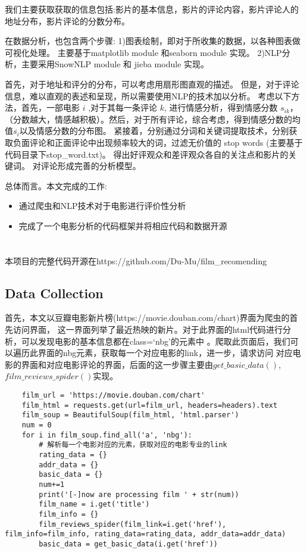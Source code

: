 \documentclass[12pt]{article}
\begin{document}
我们主要获取获取的信息包括:影片的基本信息，影片的评论内容，影片评论人的地址分布，影片评论的分数分布。
\\
\par
在数据分析，也包含两个步骤: 1)图表绘制，即对于所收集的数据，以各种图表做可视化处理。
主要基于matplotlib module 和seaborn module 实现。 2)NLP分析，主要采用SnowNLP module 和
jieba module 实现。\cite{wangWhichMoreSuitable2009}
\par
首先，对于地址和评分的分布，可以考虑用扇形图直观的描述。
但是，对于评论信息，难以直观的表述和呈现，所以需要使用NLP的技术加以分析。
考虑以下方法，首先，一部电影 $i$ ,对于其每一条评论 $k$, 进行情感分析，得到情感分数 $s_{ik}$，
（分数越大，情感越积极）。然后，对于所有评论，综合考虑，得到情感分数的均值$\overline{s_i}$以及情感分数的分布图。
紧接着，分别通过分词和关键词提取技术，分别获取负面评论和正面评论中出现频率较大的词，过滤无价值的 stop words
(主要基于代码目录下stop\_word.txt)。
得出好评观众和差评观众各自的关注点和影片的关键词。 对评论形成完善的分析模型。
\\
\par 
总体而言。本文完成的工作:
\begin{itemize}
    \item 通过爬虫和NLP技术对于电影进行评价性分析
    \item 完成了一个电影分析的代码框架并将相应代码和数据开源
\end{itemize}

\section{}
本项目的完整代码开源在https://github.com/Du-Mu/film\_recomending

\subsection{Data Collection}

首先，本文以豆瓣电影新片榜(https://movie.douban.com/chart)界面为爬虫的首先访问界面，
这一界面列举了最近热映的新片。对于此界面的html代码进行分析，可以发现电影的基本信息都在class=‘nbg’的元素中
。爬取此页面后，我们可以遍历此界面的nbg元素，获取每一个对应电影的link，进一步，请求访问
对应电影的界面和对应电影评论的界面，后面的这一步骤主要由$get\_basic\_data()$,$film\_reviews\_spider()$实现。
\lstset{language=Python}
\begin{lstlisting}
    film_url = 'https://movie.douban.com/chart'
    film_html = requests.get(url=film_url, headers=headers).text
    film_soup = BeautifulSoup(film_html, 'html.parser')
    num = 0
    for i in film_soup.find_all('a', 'nbg'):
        # 解析每一个电影对应的元素，获取对应的电影专业的link
        rating_data = {}
        addr_data = {}
        basic_data = {}
        num+=1
        print('[-]now are processing film ' + str(num))
        film_name = i.get('title')
        film_info = {}
        film_reviews_spider(film_link=i.get('href'), film_info=film_info, rating_data=rating_data, addr_data=addr_data)
        basic_data = get_basic_data(i.get('href'))
\end{lstlisting}
\end{document}
